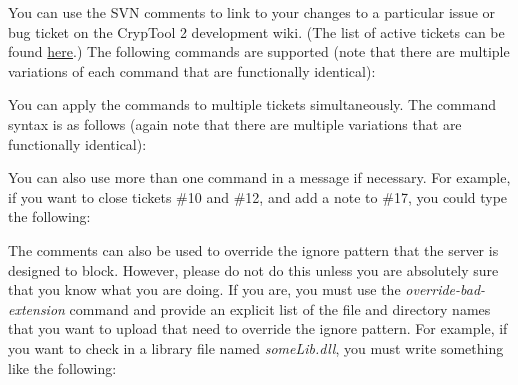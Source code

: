You can use the SVN comments to link to your changes to a particular issue or bug ticket on the CrypTool 2 development wiki. (The list of active tickets can be found \href{https://trac.ct2.cryptool.org/report/1}{here}.) The following commands are supported (note that there are multiple variations of each command that are functionally identical):

\begin{center}
\end{center}
\clearpage

You can apply the commands to multiple tickets simultaneously. The command syntax is as follows (again note that there are multiple variations that are functionally identical):

\begin{center}
\end{center}

You can also use more than one command in a message if necessary. For example, if you want to close tickets \#10 and \#12, and add a note to \#17, you could type the following:

\begin{center}
\end{center}

The comments can also be used to override the ignore pattern that the server is designed to block. However, please do not do this unless you are absolutely sure that you know what you are doing. If you are, you must use the \textit{override-bad-extension} command and provide an explicit list of the file and directory names that you want to upload that need to override the ignore pattern. For example, if you want to check in a library file named \textit{someLib.dll}, you must write something like the following:

